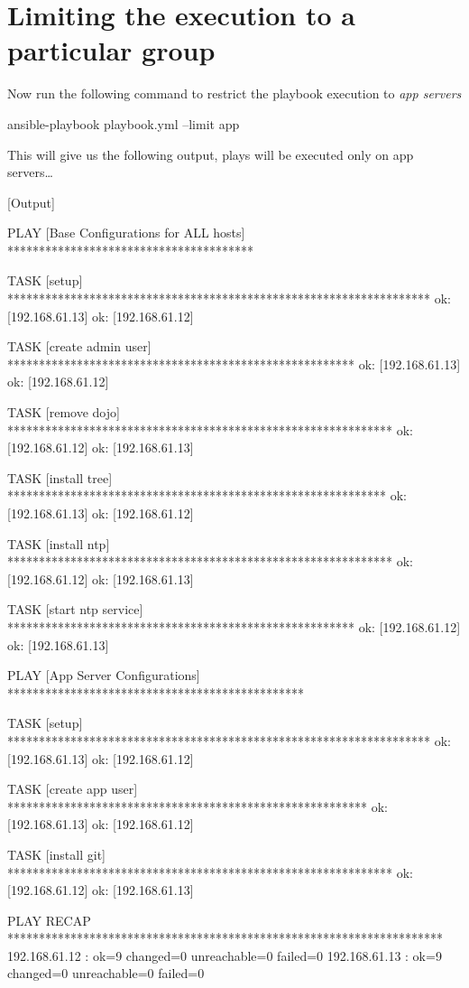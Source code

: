 \section{Limiting the execution to a particular group}

Now run the following command to restrict the playbook execution to \emph{app servers}

\begin{code}
ansible-playbook playbook.yml --limit app
\end{code}

This will give us the following output, plays will be executed only on app servers\ldots{}

[Output]\newline
\begin{code}
PLAY [Base Configurations for ALL hosts] ***************************************

TASK [setup] *******************************************************************
ok: [192.168.61.13]
ok: [192.168.61.12]

TASK [create admin user] *******************************************************
ok: [192.168.61.13]
ok: [192.168.61.12]

TASK [remove dojo] *************************************************************
ok: [192.168.61.12]
ok: [192.168.61.13]

TASK [install tree] ************************************************************
ok: [192.168.61.13]
ok: [192.168.61.12]

TASK [install ntp] *************************************************************
ok: [192.168.61.12]
ok: [192.168.61.13]

TASK [start ntp service] *******************************************************
ok: [192.168.61.12]
ok: [192.168.61.13]

PLAY [App Server Configurations] ***********************************************

TASK [setup] *******************************************************************
ok: [192.168.61.13]
ok: [192.168.61.12]

TASK [create app user] *********************************************************
ok: [192.168.61.13]
ok: [192.168.61.12]

TASK [install git] *************************************************************
ok: [192.168.61.12]
ok: [192.168.61.13]

PLAY RECAP *********************************************************************
192.168.61.12              : ok=9    changed=0    unreachable=0    failed=0
192.168.61.13              : ok=9    changed=0    unreachable=0    failed=0
\end{code}

